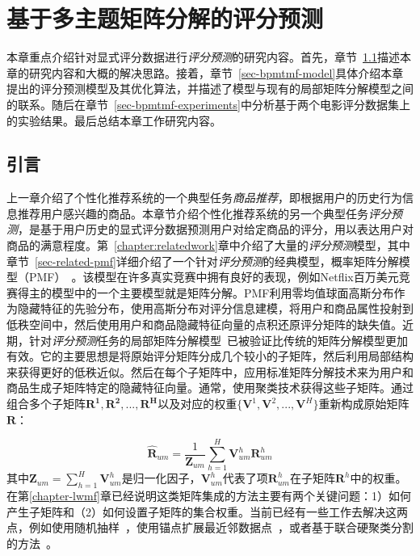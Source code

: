 \chapter{基于多主题矩阵分解的评分预测}
\label{chapter-bpmtmf}
本章重点介绍针对显式评分数据进行\textit{评分预测}的研究内容。首先，章节~\ref{sec-bpmtmf-intro}描述本章的研究内容和大概的解决思路。接着，章节~\ref{sec-bpmtmf-model}具体介绍本章提出的评分预测模型及其优化算法，并描述了模型与现有的局部矩阵分解模型之间的联系。随后在章节~\ref{sec-bpmtmf-experiments}中分析基于两个电影评分数据集上的实验结果。最后总结本章工作研究内容。

\section{引言}
\label{sec-bpmtmf-intro}


上一章介绍了个性化推荐系统的一个典型任务\textit{商品推荐}，即根据用户的历史行为信息推荐用户感兴趣的商品。本章节介绍个性化推荐系统的另一个典型任务\textit{评分预测}，是基于用户历史的显式评分数据预测用户对给定商品的评分，用以表达用户对商品的满意程度。第~\ref{chapter:relatedwork}章中介绍了大量的\textit{评分预测}模型，其中章节~\ref{sec-related-pmf}详细介绍了一个针对\textit{评分预测}的经典模型，概率矩阵分解模型（PMF）~\cite{salakhutdinov2007probabilistic}。该模型在许多真实竞赛中拥有良好的表现，例如Netflix百万美元竞赛得主的模型中的一个主要模型就是矩阵分解。PMF利用零均值球面高斯分布作为隐藏特征的先验分布，使用高斯分布对评分信息建模，将用户和商品属性投射到低秩空间中，然后使用用户和商品隐藏特征向量的点积还原评分矩阵的缺失值。近期，针对\textit{评分预测}任务的局部矩阵分解模型~\cite{lee2013local}已被验证比传统的矩阵分解模型更加有效。它的主要思想是将原始评分矩阵分成几个较小的子矩阵，然后利用局部结构来获得更好的低秩近似。然后在每个子矩阵中，应用标准矩阵分解技术来为用户和商品生成子矩阵特定的隐藏特征向量。通常，使用聚类技术获得这些子矩阵。通过组合多个子矩阵$\mathbf{\mathbf{R}^1,\mathbf{R}^2,..., \mathbf{R}^H}$以及对应的权重$\{\mathbf{V}^1,\mathbf{V}^2,...,\mathbf{V}^H\}$重新构成原始矩阵$\mathbf{R}$：

\begin{equation}
\label{eq-bpmtmf-localmf}
\hat{\mathbf{R}}_{um}= \frac{1}{\mathbf{Z}_{um}}\sum_{h=1}^H \mathbf{V}_{um}^{h}\mathbf{R}_{um}^{h}
\end{equation}
其中$\mathbf{Z}_{um}=\sum_{h=1}^H\mathbf{V}_{um}^h$是归一化因子，$\mathbf{V}_{um}^h$代表了项$\mathbf{R}_{um}^h$在子矩阵$\mathbf{R}^h$中的权重。在第\ref{chapter-lwmf}章已经说明这类矩阵集成的方法主要有两个关键问题：1）如何产生子矩阵和（2）如何设置子矩阵的集合权重。当前已经有一些工作去解决这两点，例如使用随机抽样~\cite{MJT11}，使用锚点扩展最近邻数据点~\cite{lee2013local,lee2014local}，或者基于联合硬聚类分割的方法~\cite{chen2015wemarec}。


